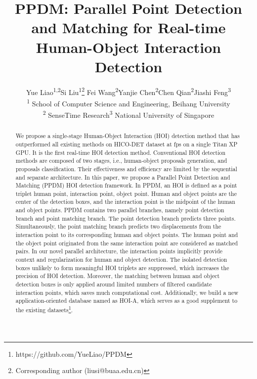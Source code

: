 \documentclass[10pt,twocolumn,letterpaper]{article}
\begin{document}
\title{PPDM: Parallel Point Detection and Matching for Real-time Human-Object
Interaction Detection}

\author{Yue Liao\textsuperscript{\rm 1,2}\quad Si Liu\textsuperscript{\rm 1}\thanks{Corresponding author (liusi@buaa.edu.cn)} \quad Fei Wang\textsuperscript{\rm 2}\quad Yanjie Chen\textsuperscript{\rm 2}\quad Chen Qian\textsuperscript{\rm 2}\quad Jiashi Feng\textsuperscript{\rm 3}\\
\large\textsuperscript{\rm 1} School of Computer Science and Engineering, Beihang University \\\quad\textsuperscript{\rm 2} SenseTime Research\quad\textsuperscript{\rm 3} National University of Singapore}


\maketitle
\begin{abstract}
We propose a single-stage Human-Object Interaction (HOI) detection method that has outperformed all existing methods on HICO-DET dataset at  fps on a single Titan XP GPU. It is the first real-time HOI detection method. 
Conventional HOI detection methods are composed of two stages, i.e., human-object proposals generation, and proposals classification. Their effectiveness and efficiency are limited by the sequential and separate architecture. 
In this paper, we propose a Parallel Point Detection and Matching (PPDM) HOI detection framework. In PPDM, an HOI is defined as a point triplet  human point, interaction point, object point. Human and object points are the center of the detection boxes, and the interaction point is the midpoint of the human and object points. 
PPDM contains two parallel branches, namely point detection branch and point matching branch.
The point detection branch predicts three points. Simultaneously, the point matching branch predicts two displacements from the interaction point to its corresponding human and object points. The human point and the object point originated from the same interaction point are considered as matched pairs. 
In our novel parallel architecture, the interaction points implicitly provide context and regularization for human and object detection. The isolated detection boxes unlikely to form meaningful HOI triplets are suppressed, which increases the precision of HOI detection. Moreover, the matching between human and object detection boxes is only applied around limited numbers of filtered candidate interaction points, which saves much computational cost. 
Additionally, we build a new application-oriented database named as HOI-A, which serves as a good supplement to the existing datasets\footnote{https://github.com/YueLiao/PPDM}.
\end{abstract}
\vspace{-3mm}
\end{document}
